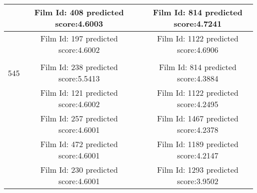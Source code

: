 \begin{longtable}{|c|c|c|c|}
\hline
\multicolumn{ 1}{|c|}{} & Film Id: 408 predicted score:4.6003 &            & Film Id: 814 predicted score:4.7241 \\
\hline
\multicolumn{ 1}{|c|}{} & Film Id: 197 predicted score:4.6002 &            & Film Id: 1122 predicted score:4.6906 \\
\hline
           &            &            &            \\
\hline
\multicolumn{ 1}{|c|}{545} & Film Id: 238 predicted score:5.5413 &            & Film Id: 814 predicted score:4.3884 \\
\hline
\multicolumn{ 1}{|c|}{} & Film Id: 121 predicted score:4.6002 &            & Film Id: 1122 predicted score:4.2495 \\
\hline
\multicolumn{ 1}{|c|}{} & Film Id: 257 predicted score:4.6001 &            & Film Id: 1467 predicted score:4.2378 \\
\hline
\multicolumn{ 1}{|c|}{} & Film Id: 472 predicted score:4.6001 &            & Film Id: 1189 predicted score:4.2147 \\
\hline
\multicolumn{ 1}{|c|}{} & Film Id: 230 predicted score:4.6001 &            & Film Id: 1293 predicted score:3.9502 \\


\end{longtable}
